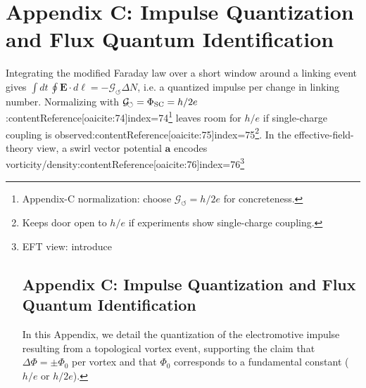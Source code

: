 \documentclass[12pt]{article}
\begin{document}
\section*{Appendix C: Impulse Quantization and Flux Quantum Identification}\label{app:Impulse}
    Integrating the modified Faraday law over a short window around a linking event gives $\int dt\,\oint \mathbf E\!\cdot d\boldsymbol\ell = -\mathcal G_{\!\circlearrowleft}\Delta N$, i.e. a quantized impulse per change in linking number. Normalizing with $\mathcal G_{\!\circlearrowleft}=\Phi_{\rm SC}=h/2e$:contentReference[oaicite:74]{index=74}\footnote{Appendix-C normalization: choose $\mathcal G_{\!\circlearrowleft}=h/2e$ for concreteness.} leaves room for $h/e$ if single-charge coupling is observed:contentReference[oaicite:75]{index=75}\footnote{Keeps door open to $h/e$ if experiments show single-charge coupling.}. In the effective-field-theory view, a swirl vector potential $\mathbf a$ encodes vorticity/density:contentReference[oaicite:76]{index=76}\footnote{EFT view: introduce


\section*{Appendix C: Impulse Quantization and Flux Quantum Identification}\label{app:Impulse}
In this Appendix, we detail the quantization of the electromotive impulse resulting from a topological vortex event, supporting the claim that $\Delta\Phi = \pm \Phi_{0}$ per vortex and that $\Phi_{0}$ corresponds to a fundamental constant ($h/e$ or $h/2e$).

}
\end{document}
